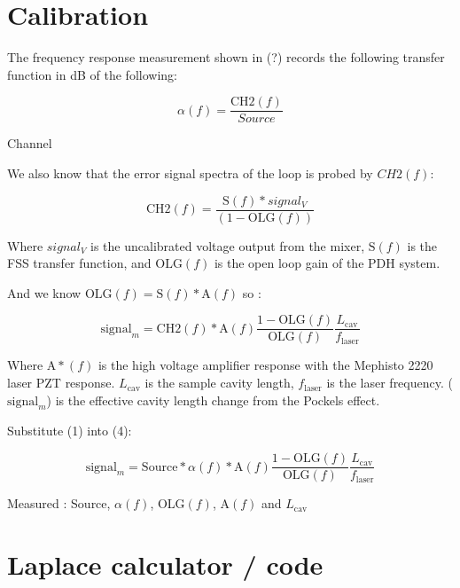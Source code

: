 
\section{Calibration}
The frequency response measurement shown in (?) records the following transfer function in dB of the following:

\begin{equation}
\alpha(f) = \frac{\mathrm{CH2}(f)}{Source}
\end{equation}

Channel

We also know that the error signal spectra of the loop is probed by $CH2(f)$:


\begin{equation}
\mathrm{CH2}(f) = \frac{\mathrm{S}(f)*signal_V}{(1-\mathrm{OLG}(f))}
\end{equation}

Where $signal_V$ is the uncalibrated voltage output from the mixer, $\mathrm{S}(f)$ is the FSS transfer function, and $\mathrm{OLG}(f)$ is the open loop gain of the PDH system.

And we know $\mathrm{OLG}(f) = \mathrm{S}(f)*\mathrm{A}(f)$ so :

\begin{equation}
\mathrm{signal}_m = \mathrm{CH2}(f)*\mathrm{A}(f) \frac{1-\mathrm{OLG}(f)}{\mathrm{OLG}(f)} \frac{L_\mathrm{cav}}{f_\mathrm{laser}}
\end{equation}

Where $\mathrm{A}*(f)$ is the high voltage amplifier response with the Mephisto 2220 laser PZT response. $L_\mathrm{cav}$ is the sample cavity length, $f_\mathrm{laser}$ is the laser frequency. ($\mathrm{signal}_m$)  is the effective cavity length change from the Pockels effect.

Substitute (1) into (4):

\begin{equation}
\mathrm{signal}_m = \mathrm{Source} * \alpha(f) * \mathrm{A}(f) \frac{1-\mathrm{OLG}(f)}{\mathrm{OLG}(f)} \frac{L_\mathrm{cav}}{f_\mathrm{laser}}
\end{equation}

Measured : 
Source, $\alpha (f)$, OLG$(f)$, A$(f)$ and $L_\mathrm{cav}$

\section{Laplace calculator / code}

